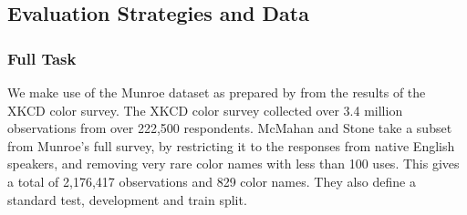 \documentclass[]{clv3}
\newcommand{\parencite}{\citep}
\newcommand{\textcite}{\citet}
\begin{document}
\subsection{Evaluation Strategies and Data}


\subsubsection{Full Task}
We make use of the  Munroe dataset as prepared by \textcite{mcmahan2015bayesian} from the results of the XKCD color survey.
The XKCD color survey \parencite{Munroe2010XKCDdataset} collected over 3.4 million observations from over 222,500 respondents.
McMahan and Stone take a subset from Munroe's full survey, by restricting it to the responses from native English speakers, 
and removing very rare color names with less than 100 uses.
This gives a total of 2,176,417 observations and 829 color names. 
They also define a standard test, development and train split.
\end{document}
